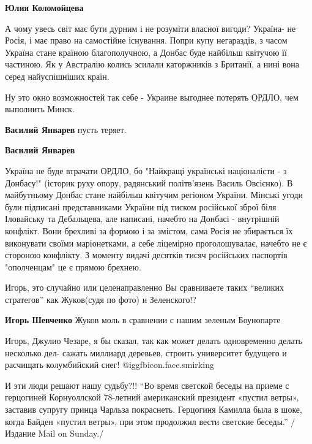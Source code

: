 \begin{itemize}
\begin{itemize}
\textbf{Юлия Коломойцева} 

А чому увесь світ має бути дурним і не розуміти власної вигоди? Україна- не
Росія, і має право на самостійне існування. Попри купу негараздів, з часом
Україна стане країною благополучною, а Донбас буде найбільш квітучою її
частиною. Як у Австралію колись зсилали каторжників з Британії, а нині вона
серед найуспішніших країн.

\end{itemize} %


Ну это окно возможностей так себе - Украине выгоднее потерять ОРДЛО, чем
выполнить Минск.

\begin{itemize} %
\textbf{Василий Январев} пусть теряет.

\textbf{Василий Январев} 

Україна не буде втрачати ОРДЛО, бо "Найкращі українські націоналісти - з
Донбасу!" (історик руху опору, радянський політв'язень Василь Овсієнко). В
майбутньому Донбас стане найбільш квітучим регіоном України. Мінські угоди були
підписані представниками України під тиском російської зброї біля Іловайську та
Дебальцева, але написані, начебто на Донбасі - внутрішній конфлікт. Вони
брехливі за формою і за змістом, сама Росія не збирається їх виконувати своїми
маріонетками, а себе ліцемірно проголошувалає, начебто не є стороною конфлікту.
З моменту видачі десятків тисяч російських паспортів "ополченцам" це є прямою
брехнею.

\end{itemize} %

Игорь, это случайно или целенаправленно Вы сравниваете таких \enquote{великих
стратегов} как Жуков(судя по фото) и Зеленского!?

\begin{itemize} %
\textbf{Игорь Шевченко} Жуков моль в сравнении с нашим зеленым Боунопарте

Игорь, Джулио Чезаре, я бы сказал, так как может делать одновременно делать несколько дел- сажать миллиард деревьев, строить университет будущего и расчищать колумбийский снег! @igg{fbicon.face.smirking} 
\end{itemize} %


И эти люди решают нашу судьбу?!! \enquote{Во время светской беседы на приеме с
герцогиней Корнуоллской 78-летний американский президент «пустил ветры»,
заставив супругу принца Чарльза покраснеть. Герцогиня Камилла была в шоке,
когда Байден «пустил ветры», при этом продолжил вести светские беседы.} /
Издание Mail on Sunday./



\end{itemize}
